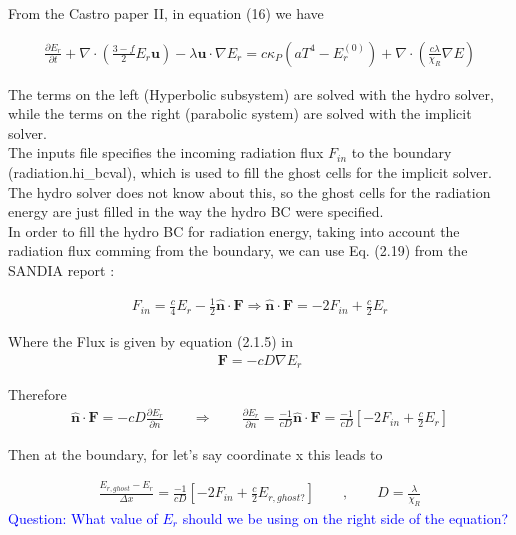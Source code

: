\documentclass[11pt]{article}
\begin{document}
	
	From the Castro paper II, \cite{castroGray} in equation (16) we have
	
	\begin{align*}	
	 \frac{\partial E_r}{\partial t} + \nabla \cdot \left( \frac{3-f}{2} E_r \bm{u}\right) - \lambda \bm{u} \cdot \nabla E_r = c \kappa_P \left( a T^4 - E^{(0)}_r\right) + \nabla \cdot \left( \frac{c\lambda}{\chi_R} \nabla E\right) 
	\end{align*}

The terms on the left (Hyperbolic subsystem) are solved with the hydro solver, while the terms on the right (parabolic system) are solved with the implicit solver. \\

The inputs file specifies the incoming radiation flux $F_{in}$ to the boundary (radiation.hi\_bcval), which is used to fill the ghost cells for the implicit solver. The hydro solver does not know about this, so the ghost cells for the radiation energy are just filled in the way the hydro BC were specified. \\

In order to fill the hydro BC for radiation energy, taking into account the radiation flux comming from the boundary, we can use Eq. (2.19) from the SANDIA report \cite{advinrad} :

\begin{align*}
	F_{in} = \frac{c}{4}E_r - \frac{1}{2} \bm{\hat{n}} \cdot \bm{F} \Rightarrow
	\bm{\hat{n}} \cdot \bm{F} = -2 F_{in} + \frac{c}{2} E_r
\end{align*}

Where the Flux is given by equation (2.1.5) in \cite{advinrad} 
\begin{align*}
	\bm{F} = -c D \nabla E_r
\end{align*}
 
 Therefore
\begin{align*}
	\bm{\hat{n}} \cdot \bm{F} = -cD \frac{\partial E_r}{\partial n}
	\qquad
	\Rightarrow
	\qquad
	\frac{\partial E_r}{\partial n} = \frac{-1}{cD} \bm{\hat{n}} \cdot \bm{F} = \frac{-1}{cD} \left[ -2 F_{in} + \frac{c}{2} E_r\right]
\end{align*}

Then at the boundary, for let's say coordinate x this leads to   
 
	 \begin{align*}
	 	\frac{E_{r,ghost} - E_{r}}{\Delta x} =  \frac{-1}{cD} \left[ -2 F_{in} + \frac{c}{2} E_{r,ghost?}\right]
	 	\qquad ,
	 	\qquad
	 	D = \frac{\lambda}{\chi_R}
	 \end{align*}
\textcolor{blue}{ Question: What value of $E_r$ should we be using on the right side of the equation?}\\
	 
\end{document}
